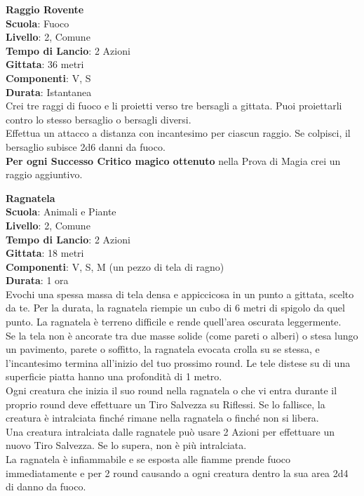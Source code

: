 \begin{multicols}{2}
\medskip\textbf{Raggio Rovente}\\
\textbf{Scuola}: Fuoco\\
\textbf{Livello}: 2, Comune\\
\textbf{Tempo di Lancio}: 2 Azioni\\
\textbf{Gittata}: 36 metri\\
\textbf{Componenti}: V, S\\
\textbf{Durata}: Istantanea\\
Crei tre raggi di fuoco e li proietti verso tre bersagli a gittata. Puoi proiettarli contro lo stesso bersaglio o bersagli diversi.\\
Effettua un attacco a distanza con incantesimo per ciascun raggio. Se colpisci, il bersaglio subisce 2d6 danni da fuoco.\\
\textbf{Per ogni Successo Critico magico ottenuto} nella Prova di Magia crei un raggio aggiuntivo.

\medskip\textbf{Ragnatela}\\
\textbf{Scuola}: Animali e Piante\\
\textbf{Livello}: 2, Comune\\
\textbf{Tempo di Lancio}: 2 Azioni\\
\textbf{Gittata}: 18 metri\\
\textbf{Componenti}: V, S, M (un pezzo di tela di ragno)\\
\textbf{Durata}: 1 ora\\
Evochi una spessa massa di tela densa e appiccicosa in un punto a gittata, scelto da te. Per la durata, la ragnatela riempie un cubo di 6 metri di spigolo da quel punto. La ragnatela è terreno difficile e rende quell'area oscurata leggermente.\\
Se la tela non è ancorate tra due masse solide (come pareti o alberi) o stesa lungo un pavimento, parete o soffitto, la ragnatela evocata crolla su se stessa, e l'incantesimo termina all'inizio del tuo prossimo round. Le tele distese su di una superficie piatta hanno una profondità di 1 metro.\\
Ogni creatura che inizia il suo round nella ragnatela o che vi entra durante il proprio round deve effettuare un Tiro Salvezza su Riflessi. Se lo fallisce, la creatura è intralciata finché rimane nella ragnatela o finché non si libera.\\
Una creatura intralciata dalle ragnatele può usare 2 Azioni per effettuare un nuovo Tiro Salvezza. Se lo supera, non è più intralciata.\\
La ragnatela è infiammabile e se esposta alle fiamme prende fuoco immediatamente e per 2 round causando a ogni creatura dentro la sua area 2d4 di danno da fuoco.


\end{multicols}
